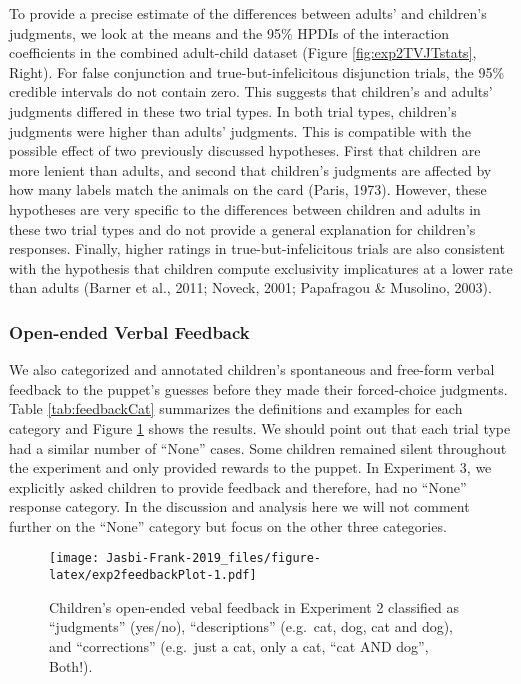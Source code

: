 \documentclass[
  english,
  ,man,floatsintext]{apa6}
\begin{document}
To provide a precise estimate of the differences between adults' and children's judgments, we look at the means and the 95\% HPDIs of the interaction coefficients in the combined adult-child dataset (Figure \ref{fig:exp2TVJTstats}, Right). For false conjunction and true-but-infelicitous disjunction trials, the 95\% credible intervals do not contain zero. This suggests that children's and adults' judgments differed in these two trial types. In both trial types, children's judgments were higher than adults' judgments. This is compatible with the possible effect of two previously discussed hypotheses. First that children are more lenient than adults, and second that children's judgments are affected by how many labels match the animals on the card (Paris, 1973). However, these hypotheses are very specific to the differences between children and adults in these two trial types and do not provide a general explanation for children's responses. Finally, higher ratings in true-but-infelicitous trials are also consistent with the hypothesis that children compute exclusivity implicatures at a lower rate than adults (Barner et al., 2011; Noveck, 2001; Papafragou \& Musolino, 2003).

\hypertarget{open-ended-verbal-feedback}{%
\subsubsection{Open-ended Verbal Feedback}\label{open-ended-verbal-feedback}}

We also categorized and annotated children's spontaneous and free-form verbal feedback to the puppet's guesses before they made their forced-choice judgments. Table \ref{tab:feedbackCat} summarizes the definitions and examples for each category and Figure \ref{fig:exp2feedbackPlot} shows the results. We should point out that each trial type had a similar number of \enquote{None} cases. Some children remained silent throughout the experiment and only provided rewards to the puppet. In Experiment 3, we explicitly asked children to provide feedback and therefore, had no \enquote{None} response category. In the discussion and analysis here we will not comment further on the \enquote{None} category but focus on the other three categories.

\begin{figure}
\centering
\texttt{[image: Jasbi-Frank-2019\_files/figure-latex/exp2feedbackPlot-1.pdf]}
\caption{\label{fig:exp2feedbackPlot}Children's open-ended vebal feedback in Experiment 2 classified as \enquote{judgments} (yes/no), \enquote{descriptions} (e.g.~cat, dog, cat and dog), and \enquote{corrections} (e.g.~just a cat, only a cat, \enquote{cat AND dog}, Both!).}
\end{figure}
\end{document}
